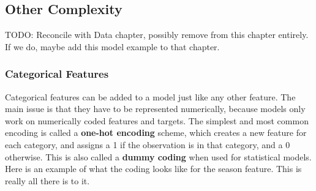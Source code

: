 \documentclass[
  letterpaper,
]{krantz}
\begin{document}
\subsection{Other Complexity}\label{sec-lm-other-complexity}

TODO: Reconcile with Data chapter, possibly remove from this chapter
entirely. If we do, maybe add this model example to that chapter.

\subsubsection{Categorical Features}\label{sec-lm-categorical-features}

Categorical features can be added to a model just like any other
feature. The main issue is that they have to be represented numerically,
because models only work on numerically coded features and targets. The
simplest and most common encoding is called a \textbf{one-hot encoding}
scheme, which creates a new feature for each category, and assigns a 1
if the observation is in that category, and a 0 otherwise. This is also
called a \textbf{dummy coding} when used for statistical models. Here is
an example of what the coding looks like for the season feature. This is
really all there is to it.
\end{document}
